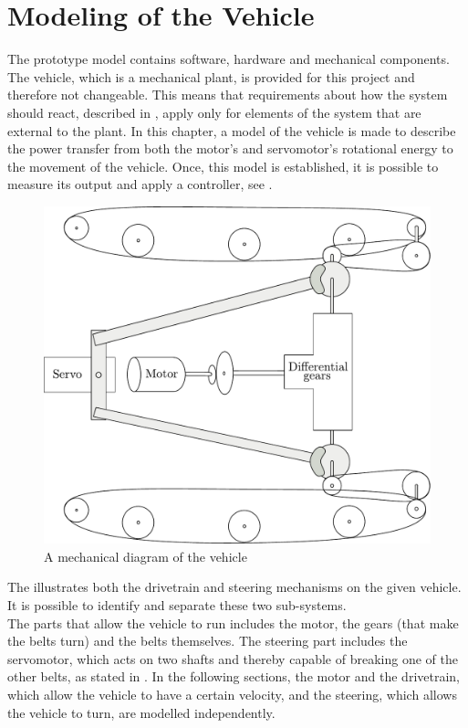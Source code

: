 \chapter{Modeling of the Vehicle}\label{cha:ModelOfVehicle}

The prototype model contains software, hardware and mechanical components. The vehicle, which is a mechanical plant, is provided for this project and therefore not changeable. This means that requirements about how the system should react, described in , apply only for elements of the system that are external to the plant. In this chapter, a model of the vehicle is made to describe the power transfer from both the motor's and servomotor's rotational energy to the movement of the vehicle. Once, this model is established, it is possible to measure its output and apply a controller, see .


\begin{figure}[H]
	\centering
	\includegraphics[width=\textwidth]{figures/completeMechanical.pdf}
	\caption{A mechanical diagram of the vehicle}
	\label{fig:completeMechanicalDiagram}
\end{figure}

The  illustrates both the drivetrain and steering mechanisms on the given vehicle. It is possible to identify and separate these two sub-systems.\\
The parts that allow the vehicle to run includes the motor, the gears (that make the belts turn) and the belts themselves. The steering part includes the servomotor, which acts on two shafts and thereby capable of breaking one of the other belts, as stated in . In the following sections, the motor and the drivetrain, which allow the vehicle to have a certain velocity, and the steering, which allows the vehicle to turn, are modelled independently.